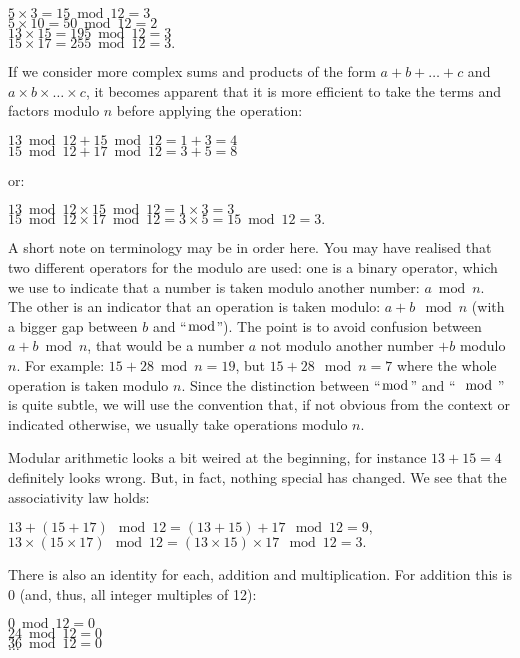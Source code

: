 \documentclass{scrreprt}
\begin{document}
$ 5 \times  3 =  15 \bmod 12 = 3$\\
$ 5 \times 10 =  50 \bmod 12 = 2$\\
$13 \times 15 = 195 \bmod 12 = 3$\\
$15 \times 17 = 255 \bmod 12 = 3.$

If we consider more complex sums and products
of the form $a + b + \dots + c$ and
$a \times b \times \dots \times c$,
it becomes apparent that it is more efficient
to take the terms and factors modulo $n$
before applying the operation:

$13 \bmod 12 + 15 \bmod 12 = 1 + 3 = 4$\\
$15 \bmod 12 + 17 \bmod 12 = 3 + 5 = 8$

or:

$13 \bmod 12 \times 15 \bmod 12 = 1 \times 3 = 3$\\
$15 \bmod 12 \times 17 \bmod 12 = 3 \times 5 = 15 \bmod 12 = 3.$

A short note on terminology may be in order here.
You may have realised that two different
operators for the modulo are used:
one is a binary operator, which we use to indicate
that a number is taken modulo another number: $a \bmod n$.
The other is an indicator that an operation is taken modulo:
$a + b \mod n$ (with a bigger gap between $b$ and ``$\bmod$'').
The point is to avoid confusion between $a + b \bmod n$,
that would be a number $a$ not modulo another number $+ b$ modulo $n$.
For example: $15 + 28 \bmod n = 19$, but $15 + 28 \mod n = 7$
where the whole operation is taken modulo $n$.
Since the distinction between ``$\bmod$'' and ``$\mod$'' is quite subtle,
we will use the convention that, if not obvious from the context
or indicated otherwise, we usually take operations modulo $n$.

Modular arithmetic looks a bit weired at the beginning,
for instance $13 + 15 = 4$ definitely looks wrong.
But, in fact, nothing special has changed.
We see that the associativity law holds:

$13 + (15 + 17) \mod 12 = (13 + 15) + 17 \mod 12 = 9,$\\
$13 \times (15 \times 17) \mod 12 = (13 \times 15) \times 17 \mod 12 = 3.$

There is also an identity for each, addition and multiplication.
For addition this is 0 (and, thus, all integer multiples of 12):

$ 0 \bmod 12 = 0$\\
$24 \bmod 12 = 0$\\
$36 \bmod 12 = 0$\\
$\dots$
\end{document}
